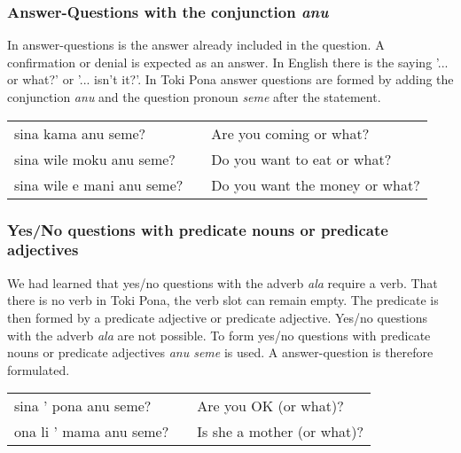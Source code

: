 %
\subsubsection*{Answer-Questions with the conjunction \textit{anu}}
%
%
In answer-questions is the answer already included in the question. 
A confirmation or denial is expected as an answer.
In English there is the saying '... or what?' or '... isn't it?'. 
In Toki Pona answer questions are formed by adding the conjunction \textit{anu} and the question pronoun \textit{seme} after the statement.

\begin{supertabular}{p{5,5cm}|ll}
sina kama anu seme? && Are you coming or what? \\ 
sina wile moku anu seme? && Do you want to eat or what? \\
sina wile e mani anu seme? && Do you want the money or what? \\
\end{supertabular} 

%
\subsubsection*{Yes/No questions with predicate nouns or predicate adjectives}
%
%
We had learned that yes/no questions with the adverb \textit{ala} require a verb. 
That there is no verb in Toki Pona, the verb slot can remain empty. 
The predicate is then formed by a predicate adjective or predicate adjective.
Yes/no questions with the adverb \textit{ala} are not possible. 
To form yes/no questions with predicate nouns or predicate adjectives \textit{anu seme} is used. 
A answer-question is therefore formulated.

\begin{supertabular}{p{5,5cm}|ll}
sina ' pona anu seme? && Are you OK (or what)? \\
ona li ' mama anu seme? && Is she a mother (or what)? \\
\end{supertabular} 

